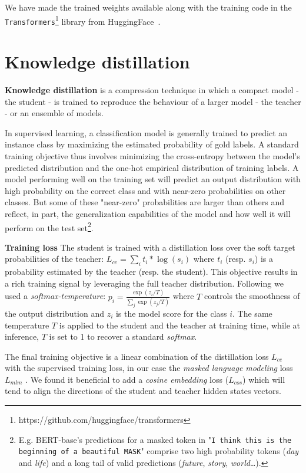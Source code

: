 \documentclass{article}
\begin{document}
We have made the trained weights available along with the training code in the \texttt{Transformers}\footnote{https://github.com/huggingface/transformers} library from HuggingFace~\citep{wolf2019transformers}.

\section{Knowledge distillation}

\textbf{Knowledge distillation} \citep{Bucila2006ModelC, Hinton2015DistillingTK} is a compression technique in which a compact model - the student - is trained to reproduce the behaviour of a larger model - the teacher - or an ensemble of models.

In supervised learning, a classification model is generally trained to predict an instance class by maximizing the estimated probability of gold labels. A standard training objective thus involves minimizing the cross-entropy between the model's predicted distribution and the one-hot empirical distribution of training labels. A model performing well on the training set will predict an output distribution with high probability on the correct class and with near-zero probabilities on other classes. But some of these "near-zero" probabilities are larger than others and reflect, in part, the generalization capabilities of the model and how well it will perform on the test set\footnote{E.g. BERT-base's predictions for a masked token in "\texttt{I think this is the beginning of a beautiful \lbrack MASK\rbrack}" comprise two high probability tokens (\textit{day} and \textit{life}) and a long tail of valid predictions (\textit{future}, \textit{story}, \textit{world}\dots).
}.

\textbf{Training loss} The student is trained with a distillation loss over the soft target probabilities of the teacher: $L_{ce} = \sum_i t_i * \log (s_i)$ where $t_i$ (resp. $s_i$) is a probability estimated by the teacher (resp. the student). This objective results in a rich training signal by leveraging the full teacher distribution. Following \citet{Hinton2015DistillingTK} we used a \textit{softmax-temperature}: $p_i = \frac{\exp (z_i / T)}{\sum_j \exp(z_j / T)}$ where $T$ controls the smoothness of the output distribution and $z_i$ is the model score for the class $i$. The same temperature $T$ is applied to the student and the teacher at training time, while at inference, $T$ is set to 1 to recover a standard \textit{softmax}.

The final training objective is a linear combination of the distillation loss $L_{ce}$ with the supervised training loss, in our case the \textit{masked language modeling} loss $L_{mlm}$ \citep{Devlin2018BERTPO}. We found it beneficial to add a \textit{cosine embedding} loss ($L_{cos}$) which will tend to align the directions of the student and teacher hidden states vectors.
\end{document}
